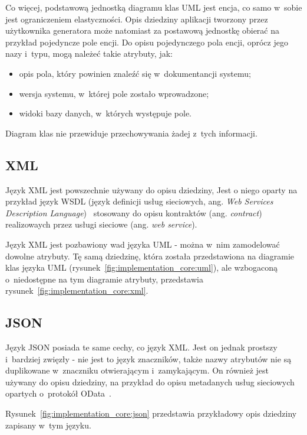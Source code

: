 Co więcej, podstawową jednostką diagramu klas UML jest encja, co samo w~sobie jest ograniczeniem elastyczności.
Opis dziedziny aplikacji tworzony przez użytkownika generatora może natomiast za postawową jednostkę obierać na przykład pojedyncze pole encji.
Do opisu pojedynczego pola encji, oprócz jego nazy i~typu, mogą należeć takie atrybuty, jak:

\begin{itemize}
 \item opis pola, który powinien znaleźć się w~dokumentancji systemu;
 \item wersja systemu, w~której pole zostało wprowadzone;
 \item widoki bazy danych, w~których występuje pole.
\end{itemize}

Diagram klas nie przewiduje przechowywania żadej z~tych informacji.


\subsection{XML}

Język XML jest powszechnie używany do opisu dziedziny,
Jest o niego oparty na przykład język WSDL (język definicji usług sieciowych, ang. \emph{Web Services Description Language})~\cite{wsdl} stosowany do opisu kontraktów (ang. \emph{contract}) realizowaych przez usługi sieciowe (ang. \emph{web service}).

Język XML jest pozbawiony wad języka UML - można w~nim zamodelować dowolne atrybuty.
Tę samą dziedzinę, która została przedstawiona na diagramie klas języka UML (rysunek~\ref{fig:implementation_core:uml}), ale wzbogaconą o~niedostępne na tym diagramie atrybuty, przedstawia rysunek~\ref{fig:implementation_core:xml}.




\subsection{JSON}

Język JSON posiada te same cechy, co język XML.
Jest on jednak prostszy i~bardziej zwięzły - nie jest to język znaczników, także nazwy atrybutów nie są duplikowane w~znaczniku otwierającym i~zamykającym.
On również jest używany do opisu dziedziny, na przykład do opisu metadanych usług sieciowych opartych o~protokół OData~\cite{odata}.

Rysunek~\ref{fig:implementation_core:json} przedstawia przykładowy opis dziedziny zapisany w~tym języku.

